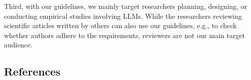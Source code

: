 Third, with our guidelines, we mainly target researchers planning, designing, or conducting empirical studies involving LLMs.
While the researchers reviewing scientific articles written by others can also use our guidelines, e.g., to check whether authors adhere to the \must requirements, reviewers are not our main target audience.

\subsection{References}





